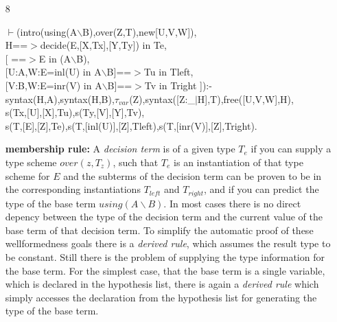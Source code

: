 \documentclass[11pt]{report}
\begin{document}
\begin{enumerate}
 \item[8]
\begin{sf}\begin{tabbing}
$\vdash$(intro(using(A$\backslash$B),over(Z,T),new[U,V,W]),\\[-0.15ex]
\hspace{2em}H==$>$decide(E,[X,Tx],[Y,Ty]) in Te,\\[-0.15ex]
\hspace{2em}[ ==$>$E in (A$\backslash$B),\\[-0.15ex]
\hspace{3em}[U:A,W:E=inl(U) in A$\backslash$B]==$>$Tu in Tleft, \\[-0.15ex]
\hspace{3em}[V:B,W:E=inr(V) in A$\backslash$B]==$>$Tv in Tright ]):-\\[-0.15ex]
\hspace{2em}syntax(H,A),syntax(H,B),$\tau_{var}$(Z),syntax([Z:\_\hspace{0.1em}$\mid$H],T),free([U,V,W],H),\\[-0.15ex]
\hspace{2em}s(Tx,[U],[X],Tu),s(Ty,[V],[Y],Tv),\\[-0.15ex]
\hspace{2em}s(T,[E],[Z],Te),s(T,[inl(U)],[Z],Tleft),s(T,[inr(V)],[Z],Tright).
\end{tabbing}\end{sf}

 {\bf membership rule:}
 A \emph{decision term} is of a given type $T_e$ if you can
 supply a type scheme $over(z,T_z)$, such that $T_e$ is an
 instantiation of that type scheme for $E$ and the subterms of
 the decision term can be proven to be in the corresponding
 instantiations $T_{left}$ and $T_{right}$, and if you can predict the
 type of the base term $using(A\backslash B)$. 
 In most cases there is no direct
 depency between the type of the decision term and the current
 value of the base term of that decision term. To simplify
 the automatic proof of these wellformedness goals there is
 a \emph{derived rule}, which assumes the result type to be constant.
 Still there is the problem of
 supplying the type information for the base term. For the
 simplest case, that the base term is a single variable, which
 is declared in the hypothesis list, there is again a \emph{derived 
 rule} which simply accesses the declaration from the hypothesis
 list for generating the type of the base term.
  

\end{enumerate}
\end{document}

